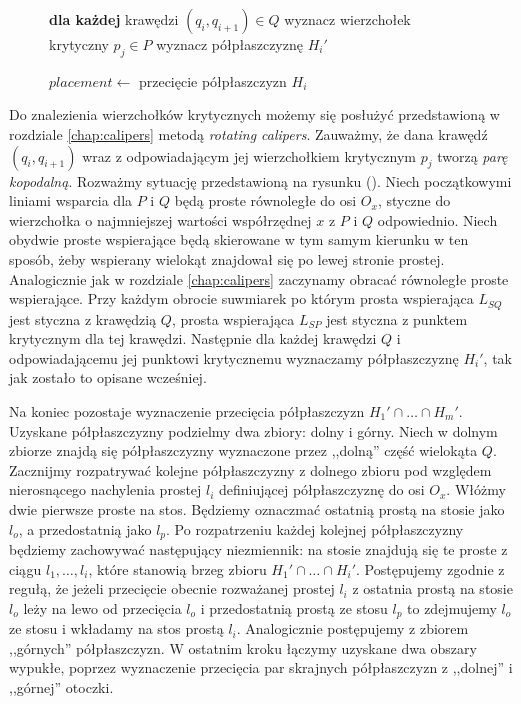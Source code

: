 \begin{figure}[htp]
\begin{algorithmic}[1]

\State \textbf{dla każdej} krawędzi $(q_i, q_{i+1}) \in Q$
\State \hspace{\algorithmicindent} wyznacz wierzchołek krytyczny $p_j \in P$
\State \hspace{\algorithmicindent} wyznacz półpłaszczyznę $H_i'$

\State $placement \gets $ przecięcie półpłaszczyzn $H_i$

\EndProcedure
\end{algorithmic}
\end{figure}

Do znalezienia wierzchołków krytycznych możemy się posłużyć
przedstawioną w rozdziale \ref{chap:calipers} metodą \emph{rotating
  calipers}. Zauważmy, że dana krawędź $(q_i, q_{i+1})$ wraz z
odpowiadającym jej wierzchołkiem krytycznym $p_j$ tworzą \emph{parę
  kopodalną}. Rozważmy sytuację przedstawioną na rysunku (). Niech
początkowymi liniami wsparcia dla $P$ i $Q$ będą proste równoległe do
osi $O_x$, styczne do wierzchołka o najmniejszej wartości współrzędnej
$x$ z $P$ i $Q$ odpowiednio. Niech obydwie proste wspierające będą
skierowane w tym samym kierunku w ten sposób, żeby wspierany wielokąt
znajdował się po lewej stronie prostej. Analogicznie jak w rozdziale
\ref{chap:calipers} zaczynamy obracać równoległe proste wspierające. Przy
każdym obrocie suwmiarek po którym prosta wspierająca $L_{SQ}$ jest
styczna z krawędzią $Q$, prosta wspierająca $L_{SP}$ jest styczna z
punktem krytycznym dla tej krawędzi. Następnie dla każdej krawędzi $Q$
i odpowiadającemu jej punktowi krytycznemu wyznaczamy półpłaszczyznę
$H_i'$, tak jak zostało to opisane wcześniej.

Na koniec pozostaje wyznaczenie przecięcia półpłaszczyzn $H_1' \cap
\ldots \cap H_m'$. Uzyskane półpłaszczyzny podzielmy dwa zbiory: dolny
i górny. Niech w dolnym zbiorze znajdą się półpłaszczyzny wyznaczone
przez ,,dolną'' część wielokąta $Q$. Zacznijmy rozpatrywać kolejne
półpłaszczyzny z dolnego zbioru pod względem nierosnącego nachylenia
prostej $l_i$ definiującej półpłaszczyznę do osi $O_x$. Włóżmy dwie
pierwsze proste na stos. Będziemy oznaczmać ostatnią prostą na stosie
jako $l_o$, a przedostatnią jako $l_p$. Po rozpatrzeniu każdej
kolejnej półpłaszczyzny będziemy zachowywać następujący niezmiennik:
na stosie znajdują się te proste z ciągu $l_1, \ldots, l_i$, które
stanowią brzeg zbioru $H_1' \cap \ldots \cap H_i'$. Postępujemy
zgodnie z regułą, że jeżeli przecięcie obecnie rozważanej prostej
$l_i$ z ostatnia prostą na stosie $l_o$ leży na lewo od przecięcia
$l_o$ i przedostatnią prostą ze stosu $l_p$ to zdejmujemy $l_o$ ze
stosu i wkładamy na stos prostą $l_i$. Analogicznie postępujemy z
zbiorem ,,górnych'' półpłaszczyzn. W ostatnim kroku łączymy uzyskane
dwa obszary wypukłe, poprzez wyznaczenie przecięcia par skrajnych
półpłaszczyzn z ,,dolnej'' i ,,górnej'' otoczki.

